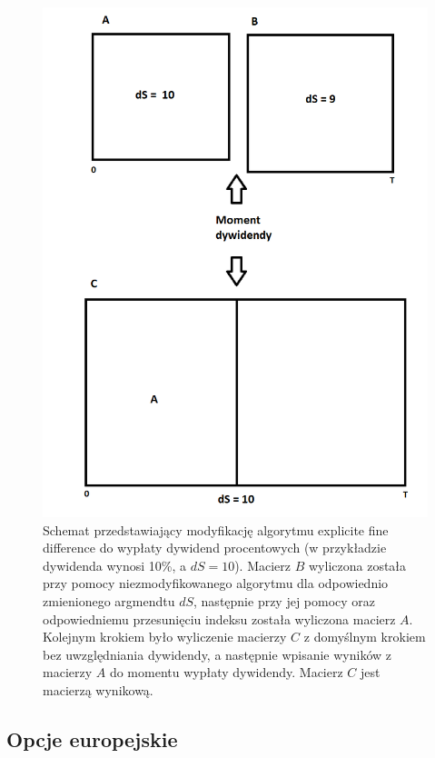 \documentclass[12pt]{article}
\begin{document}
\begin{figure}[H]
    \centering
    \includegraphics[scale = 0.7]{dividend/koncepcja.png}
    \caption{Schemat przedstawiający modyfikację algorytmu explicite fine difference do wypłaty dywidend procentowych (w przykładzie dywidenda wynosi 10\%, a $dS = 10$). Macierz $B$ wyliczona została przy pomocy niezmodyfikowanego algorytmu dla odpowiednio zmienionego argmendtu $dS$, następnie przy jej pomocy oraz odpowiedniemu przesunięciu indeksu została wyliczona macierz $A$. Kolejnym krokiem było wyliczenie macierzy $C$ z domyślnym krokiem bez uwzględniania dywidendy, a następnie wpisanie wyników z macierzy $A$ do momentu wypłaty dywidendy. Macierz $C$ jest macierzą wynikową.}
    \label{fig:koncepcja}
\end{figure}

\subsection{Opcje europejskie}
\end{document}

